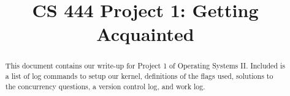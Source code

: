 \documentclass[10pt,letterpaper,draftclsnofoot,onecolumn]{IEEEtran}
\begin{document}

\begin{titlepage}
\title{CS 444 Project 1: Getting Acquainted}
\author
{
}
    \maketitle
    \vspace{2cm}
    \begin{abstract}
        \noindent This document contains our write-up for Project 1 of Operating Systems II. Included is a list of log commands to setup our kernel, definitions of the flags used, solutions to the concurrency questions, a version control log, and work log. 
    \end{abstract}

\end{titlepage}
\end{document}
